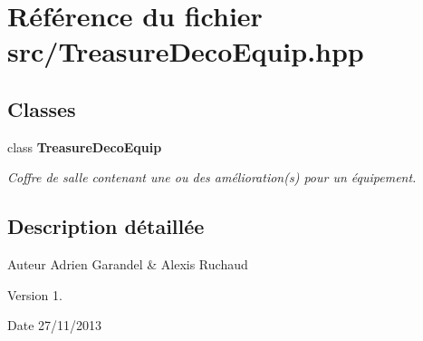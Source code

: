 \section{Référence du fichier src/\-Treasure\-Deco\-Equip.hpp}
\label{_treasure_deco_equip_8hpp}
\subsection*{Classes}
\begin{DoxyCompactItemize}
\item 
class {\bf Treasure\-Deco\-Equip}
\begin{DoxyCompactList}\small\item\em Coffre de salle contenant une ou des amélioration(s) pour un équipement. \end{DoxyCompactList}\end{DoxyCompactItemize}


\subsection{Description détaillée}
\begin{DoxyAuthor}{Auteur}
Adrien Garandel \& Alexis Ruchaud 
\end{DoxyAuthor}
\begin{DoxyVersion}{Version}
1. 
\end{DoxyVersion}
\begin{DoxyDate}{Date}
27/11/2013 
\end{DoxyDate}
